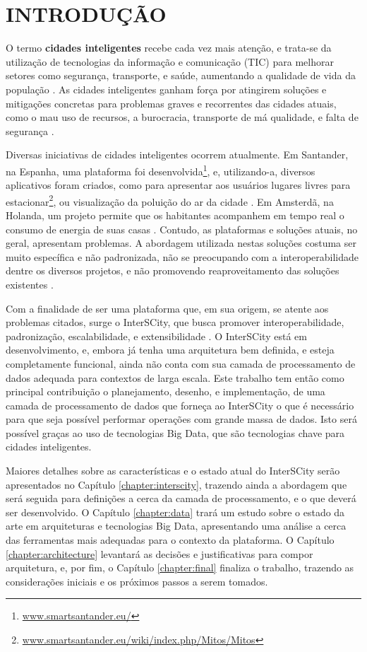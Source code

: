 \chapter[INTRODUÇÃO]{INTRODUÇÃO}
\label{chapter:intro}

O termo \textbf{cidades inteligentes} recebe cada vez mais atenção, e trata-se
da utilização de tecnologias da informação e comunicação (TIC) para melhorar
setores como segurança, transporte, e saúde, aumentando a qualidade de vida
da população \cite{batty2012smart}. As cidades inteligentes ganham força por
atingirem soluções e mitigações concretas para problemas graves e recorrentes
das cidades atuais, como o mau uso de recursos, a burocracia, transporte de má
qualidade, e falta de segurança \cite{batty2012smart}.

Diversas iniciativas de cidades inteligentes ocorrem atualmente. Em Santander,
na Espanha, uma plataforma foi
desenvolvida\footnote{\url{www.smartsantander.eu/}}, e, utilizando-a,
diversos aplicativos foram criados, como para apresentar aos usuários lugares
livres para estacionar\footnote{\url{www.smartsantander.eu/wiki/index.php/Mitos/Mitos}},
ou visualização da poluição do ar da cidade \cite{santana2016software}. Em
Amsterdã, na Holanda, um projeto permite que os habitantes acompanhem em tempo
real o consumo de energia de suas casas \cite{kon2016}. Contudo, as plataformas
e soluções atuais, no geral, apresentam problemas. A abordagem utilizada nestas
soluções costuma ser muito específica e não padronizada, não se preocupando com
a interoperabilidade dentre os diversos projetos, e não promovendo
reaproveitamento das soluções existentes \cite{delesposte2017}.

Com a finalidade de ser uma plataforma que, em sua origem, se atente aos
problemas citados, surge o InterSCity, que busca promover interoperabilidade,
padronização, escalabilidade, e extensibilidade \cite{delesposte2017}. O
InterSCity está em desenvolvimento, e, embora já tenha uma arquitetura bem
definida, e esteja completamente funcional, ainda não conta com sua camada de
processamento de dados adequada para contextos de larga escala. Este trabalho
tem então como principal contribuição o planejamento, desenho, e implementação,
de uma camada de processamento de dados que forneça ao InterSCity o que é
necessário para que seja possível performar operações com grande massa de dados.
Isto será possível graças ao uso de tecnologias Big Data, que são tecnologias
chave para cidades inteligentes\cite{batty2012smart}.

Maiores detalhes sobre as características e o estado atual do InterSCity serão
apresentados no Capítulo \ref{chapter:interscity}, trazendo ainda a abordagem que será
seguida para definições a cerca da camada de processamento, e o que deverá ser
desenvolvido. O Capítulo \ref{chapter:data} trará um estudo sobre o estado da arte
em arquiteturas e tecnologias Big Data, apresentando uma análise a cerca das
ferramentas mais adequadas para o contexto da plataforma. O Capítulo
\ref{chapter:architecture} levantará as decisões e justificativas para compor
arquitetura, e, por fim, o Capítulo \ref{chapter:final} finaliza o trabalho,
trazendo as considerações iniciais e os próximos passos a serem tomados.
